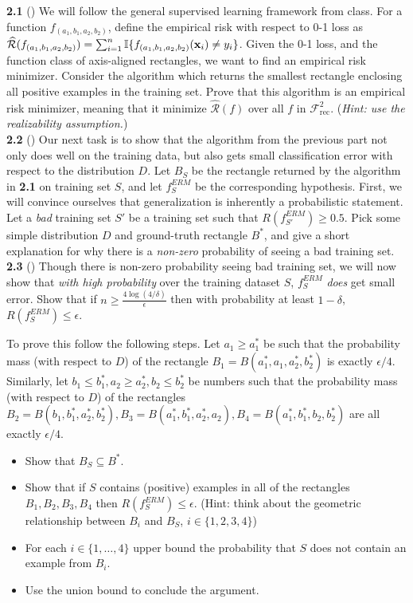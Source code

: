 \textbf{2.1} () We will follow the general supervised learning framework from class. For a function $f_{(a_1,b_1,a_2,b_2)}$, define the empirical risk with respect to 0-1 loss as $\widehat{\mathcal{R}}(f_{(a_1,b_1,a_2,b_2)})=\sum_{i=1}^n\mathbb{I}\{f_{(a_1,b_1,a_2,b_2)}(\mathbf{x}_i)\neq y_i\}$. Given the 0-1 loss, and the function class of axis-aligned rectangles, we want to find an empirical risk minimizer. Consider the algorithm which returns the smallest rectangle enclosing all positive examples in the training set. Prove that this algorithm is an empirical risk minimizer, meaning that it minimize $\widehat{\mathcal{R}}(f)$ over all $f$ in $\mathcal{F}_{\text{rec}}^2$. (\emph{Hint: use the realizability assumption.})\\

\textbf{2.2} () Our next task is to show that the algorithm from the previous part not only does well on the training data, but also gets small classification error with respect to the distribution $D$.  Let $B_S$ be the rectangle returned by the algorithm in \textbf{2.1} on training set $S$, and let $f_S^{ERM}$ be the corresponding hypothesis. First, we will convince ourselves that generalization is inherently a probabilistic statement. Let a \emph{bad} training set $S'$ be a training set such that $R(f_{S'}^{ERM})\ge 0.5$. Pick some simple distribution $D$ and ground-truth rectangle $B^*$, and give a short explanation for why there is a \emph{non-zero} probability of seeing a bad training set.\\
    
\textbf{2.3} ()  Though there is non-zero probability seeing bad training set, we will now show that \emph{with high probability} over the training dataset $S$, $f_S^{ERM}$ \emph{does} get small error. Show that if $n\ge \frac{4 \log (4/\delta)}{\epsilon}$ then with probability at least $1-\delta$, $R(f_S^{ERM})\le \epsilon$.
    
    To prove this follow the following steps. Let $a_1 \ge a_1^*$ be such that the probability mass (with respect to $D$) of the rectangle $B_1=B(a_1^*, a_1, a_2^*, b_2^*)$ is exactly $\epsilon/4$. Similarly, let $b_1\leq b_1^*, a_2\geq a_2^*,b_2\leq b_2^*$ be numbers such that the probability mass (with respect to $D$) of the rectangles $B_2=B(b_1,b_1^*, a_2^*, b_2^*), B_3=B(a_1^*, b_1^*, a_2^*, a_2), B_4=B(a_1^*, b_1^*, b_2, b_2^*)$ are all exactly $\epsilon/4$.
    \begin{itemize}
        \item Show that $B_S \subseteq B^*$.
        \item Show that if $S$ contains (positive) examples in all of the rectangles $B_1, B_2, B_3, B_4$ then $R(f_S^{ERM})\le \epsilon$. (Hint: think about the geometric relationship between $B_i$ and $B_S$, $i\in\{1,2,3,4\}$)
        \item For each $i \in \{1,\dots, 4\}$ upper bound the probability that $S$ does not contain an example from $B_i$.
        \item Use the union bound to conclude the argument.
    \end{itemize}
    
